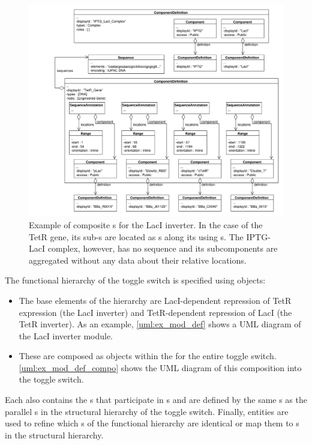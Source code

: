 \begin{figure}[ht]
\begin{center}
\includegraphics[width=\textwidth]{example_uml/toggle_2}
\caption[]{Example of composite s for the LacI inverter. In the case of the TetR gene, its sub-s are located as s along its  using s. The IPTG-LacI complex, however, has no sequence and its subcomponents are aggregated without any data about their relative locations.}
\label{uml:ex_comp_def_compo}
\end{center}
\end{figure}

The functional hierarchy of the toggle switch is specified using
 objects:
\begin{itemize}
\item The base elements of the hierarchy are LacI-dependent repression of TetR expression (the LacI inverter) and TetR-dependent repression of LacI (the TetR inverter).  As an example, \ref{uml:ex_mod_def} shows a UML diagram of the LacI inverter module.
\item These are composed as  objects within the  for the entire toggle switch.  \ref{uml:ex_mod_def_compo} shows the UML diagram of this composition into the toggle switch.
\end{itemize}

Each  also contains the s that participate in s and are defined by the same s as the parallel s in the structural hierarchy of the toggle switch. Finally,  entities are used to refine which s of the functional hierarchy are identical or map them to s in the structural hierarchy.

